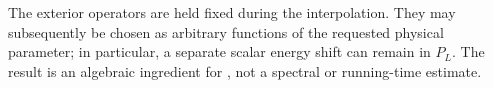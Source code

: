 The exterior operators are held fixed during the interpolation. They may
subsequently be chosen as arbitrary functions of the requested physical
parameter; in particular, a separate scalar energy shift can remain in
$P_L$. The result is an algebraic ingredient for
\cite[Proposition~5.7]{Arad2016RigorousRG}, not a spectral or running-time
estimate.

